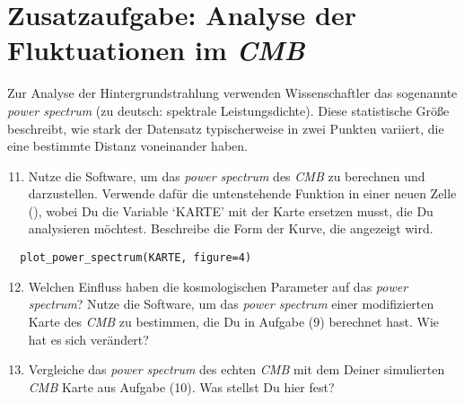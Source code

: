 \documentclass[12pt,twoside,a4paper]{article}
\newcommand{\cmb}{\emph{CMB}\xspace}
\newcommand{\plus}{\raisebox{-0.3ex}{\faPlusSquareO}\xspace}
\begin{document}
\section{Zusatzaufgabe: Analyse der Fluktuationen im \cmb}

Zur Analyse der Hintergrundstrahlung verwenden Wissenschaftler das
sogenannte \emph{power spectrum} (zu deutsch: spektrale
Leistungsdichte). Diese statistische Gr\"o{\ss}e beschreibt, wie stark
der Datensatz typischerweise in zwei Punkten variiert, die eine
bestimmte Distanz voneinander haben.

\begin{enumerate}
  \setcounter{enumi}{10}
\item Nutze die Software, um das \emph{power spectrum} des \cmb zu
  berechnen und darzustellen. Verwende daf\"ur die untenstehende
  Funktion in einer neuen Zelle (\plus), wobei Du die Variable `KARTE'
  mit der Karte ersetzen musst, die Du analysieren
  m\"ochtest. Beschreibe die Form der Kurve, die angezeigt wird.
\end{enumerate}
\vspace{-1ex}
\begin{lstlisting}
  plot_power_spectrum(KARTE, figure=4)
\end{lstlisting}
\begin{enumerate}
  \setcounter{enumi}{11}
\item Welchen Einfluss haben die kosmologischen Parameter auf das
  \emph{power spectrum}? Nutze die Software, um das \emph{power
    spectrum} einer modifizierten Karte des \cmb zu bestimmen, die Du
  in Aufgabe (9) berechnet hast. Wie hat es sich ver\"andert?
\item Vergleiche das \emph{power spectrum} des echten \cmb mit dem
  Deiner simulierten \cmb Karte aus Aufgabe (10). Was stellst Du hier
  fest?
\end{enumerate}
\end{document}

